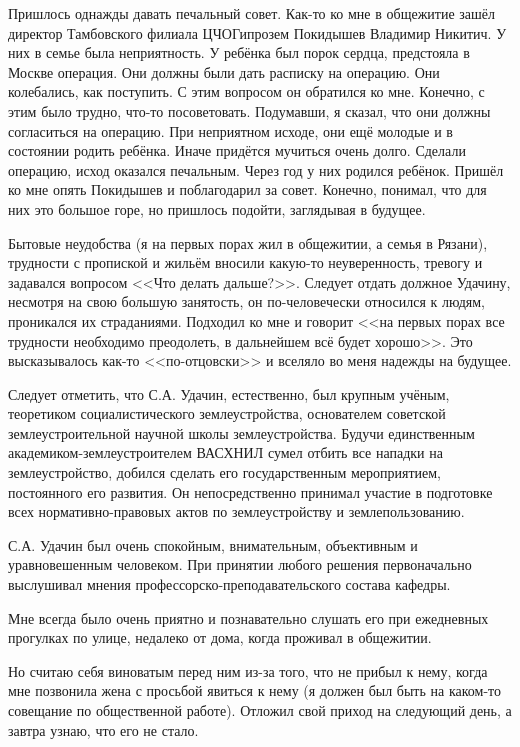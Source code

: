 Пришлось однажды давать печальный совет. Как-то ко мне в общежитие зашёл директор Тамбовского филиала ЦЧОГипрозем Покидышев Владимир Никитич. У них в семье была неприятность. У ребёнка был порок сердца, предстояла в Москве операция. Они должны были дать расписку на операцию. Они колебались, как поступить. С этим вопросом он обратился ко мне. Конечно, с этим было трудно, что-то посоветовать. Подумавши, я сказал, что они должны согласиться на операцию. При неприятном исходе, они ещё молодые и в состоянии родить ребёнка. Иначе придётся мучиться очень долго. Сделали операцию, исход оказался печальным. Через год у них родился ребёнок. Пришёл ко мне опять Покидышев и поблагодарил за совет. Конечно, понимал, что для них это большое горе, но пришлось подойти, заглядывая в будущее.

Бытовые неудобства (я на первых порах жил в общежитии, а семья в Рязани), трудности с пропиской и жильём вносили какую-то неуверенность, тревогу и задавался вопросом <<Что делать дальше?>>. Следует отдать должное Удачину, несмотря на свою большую занятость, он по-человечески относился к людям, проникался их страданиями. Подходил ко мне и говорит <<на первых порах все трудности необходимо преодолеть, в дальнейшем всё будет хорошо>>. Это высказывалось как-то <<по-отцовски>> и вселяло во меня надежды на будущее. 

Следует отметить, что С.А. Удачин, естественно, был крупным учёным, теоретиком социалистического землеустройства, основателем советской землеустроительной научной школы землеустройства. Будучи единственным академиком-землеустроителем ВАСХНИЛ сумел отбить все нападки на землеустройство, добился сделать его государственным мероприятием, постоянного его развития. Он непосредственно принимал участие в подготовке всех нормативно-правовых актов по землеустройству и землепользованию. 

С.А. Удачин был очень спокойным, внимательным, объективным и уравновешенным человеком. При принятии любого решения первоначально выслушивал мнения профессорско-преподавательского состава кафедры. 

Мне всегда было очень приятно и познавательно слушать его при ежедневных прогулках по улице, недалеко от дома, когда проживал в общежитии.

Но считаю себя виноватым перед ним из-за того, что не прибыл к нему, когда мне позвонила жена с просьбой явиться к нему (я должен был быть на каком-то совещание по общественной работе). Отложил свой приход на следующий день, а завтра узнаю, что его не стало.


